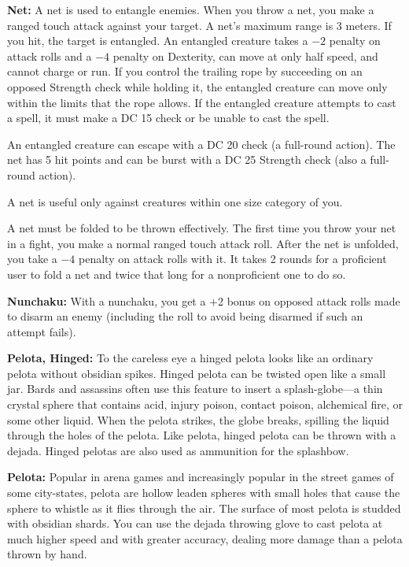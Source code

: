 \textbf{Net:} A net is used to entangle enemies. When you throw a net, you make a ranged touch attack against your target. A net's maximum range is 3 meters. If you hit, the target is entangled. An entangled creature takes a $-2$ penalty on attack rolls and a $-4$ penalty on Dexterity, can move at only half speed, and cannot charge or run. If you control the trailing rope by succeeding on an opposed Strength check while holding it, the entangled creature can move only within the limits that the rope allows. If the entangled creature attempts to cast a spell, it must make a DC 15  check or be unable to cast the spell.

An entangled creature can escape with a DC 20  check (a full-round action). The net has 5 hit points and can be burst with a DC 25 Strength check (also a full-round action).

A net is useful only against creatures within one size category of you.

A net must be folded to be thrown effectively. The first time you throw your net in a fight, you make a normal ranged touch attack roll. After the net is unfolded, you take a $-4$ penalty on attack rolls with it. It takes 2 rounds for a proficient user to fold a net and twice that long for a nonproficient one to do so. 

\textbf{Nunchaku:} With a nunchaku, you get a +2 bonus on opposed attack rolls made to disarm an enemy (including the roll to avoid being disarmed if such an attempt fails). 

\textbf{Pelota, Hinged:} To the careless eye a hinged pelota looks like an ordinary pelota without obsidian spikes. Hinged pelota can be twisted open like a small jar. Bards and assassins often use this feature to insert a splash-globe---a thin crystal sphere that contains acid, injury poison, contact poison, alchemical fire, or some other liquid. When the pelota strikes, the globe breaks, spilling the liquid through the holes of the pelota. Like pelota, hinged pelota can be thrown with a dejada. Hinged pelotas are also used as ammunition for the splashbow.

\textbf{Pelota:} Popular in arena games and increasingly popular in the street games of some city-states, pelota are hollow leaden spheres with small holes that cause the sphere to whistle as it flies through the air. The surface of most pelota is studded with obsidian shards. You can use the dejada throwing glove to cast pelota at much higher speed and with greater accuracy, dealing more damage than a pelota thrown by hand.

